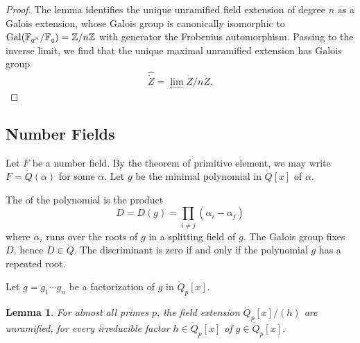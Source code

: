 \documentclass{amsart}
\newtheorem{lemma}[equation]{Lemma}
\def\oG{\op{Gal}}
\begin{document}
\begin{proof} The lemma identifies the unique unramified field
  extension of degree $n$ as a Galois extension, whose Galois group is
  canonically isomorphic to $\oG(\ring{F}_{q^n}/\ring{F}_q) =
  \ring{Z}/n\ring{Z}$ with generator the Frobenius automorphism.
  Passing to the inverse limit, we find that the unique maximal
  unramified extension has Galois group
\[
\hat{\ring{Z}} = \lim_{\leftarrow} \ring{Z}/n\ring{Z}.
\]
\end{proof}


\subsection{Number Fields}

Let $F$ be a number field. By the theorem of
primitive element, we may write $F = \ring{Q}(\alpha)$ for some
$\alpha$.  Let $g$ be the minimal polynomial in $\ring{Q}[x]$ of
$\alpha$.

The  of the polynomial is the product
\[
D = D(g) = \prod_{i\ne j} (\alpha_i-\alpha_j)
\]
where $\alpha_i$ runs over the roots of $g$ in a splitting field of
$g$.  The Galois group fixes $D$, hence $D\in\ring{Q}$.  The
discriminant is zero if and only if the polynomial $g$ has a repeated
root.

Let $g=g_1\cdots g_n$ be a factorization of $g$ in $\ring{Q}_p[x]$.

\begin{lemma} 
  For almost all primes $p$, the field extension $\ring{Q}_p[x]/(h)$
  are unramified, for every irreducible factor $h\in\ring{Q}_p[x]$ of
  $g\in\ring{Q}_p[x]$.
\end{lemma}
\end{document}

